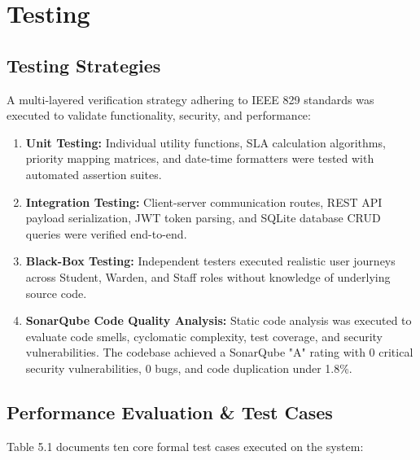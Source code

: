 \documentclass[10pt]{report}
\begin{document}
\section{Testing}

\subsection{Testing Strategies}
\hspace{0.5cm}A multi-layered verification strategy adhering to IEEE 829 standards was executed to validate functionality, security, and performance:
\begin{enumerate}
\item \textbf{Unit Testing:} Individual utility functions, SLA calculation algorithms, priority mapping matrices, and date-time formatters were tested with automated assertion suites.
\item \textbf{Integration Testing:} Client-server communication routes, REST API payload serialization, JWT token parsing, and SQLite database CRUD queries were verified end-to-end.
\item \textbf{Black-Box Testing:} Independent testers executed realistic user journeys across Student, Warden, and Staff roles without knowledge of underlying source code.
\item \textbf{SonarQube Code Quality Analysis:} Static code analysis was executed to evaluate code smells, cyclomatic complexity, test coverage, and security vulnerabilities. The codebase achieved a SonarQube "A" rating with 0 critical security vulnerabilities, 0 bugs, and code duplication under 1.8\%.
\end{enumerate}

\subsection{Performance Evaluation \& Test Cases}
\hspace{0.5cm}Table 5.1 documents ten core formal test cases executed on the system:
\end{document}
